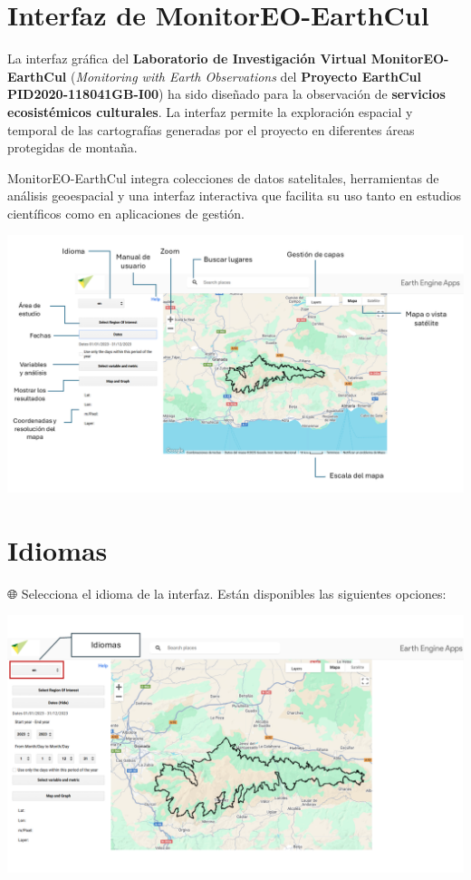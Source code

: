 \documentclass[
]{book}
\begin{document}
\chapter{Interfaz de MonitorEO-EarthCul}\label{interfaz}

La interfaz gráfica del \textbf{Laboratorio de Investigación Virtual MonitorEO-EarthCul} (\emph{Monitoring with Earth Observations} del \textbf{Proyecto EarthCul PID2020-118041GB-I00}) ha sido diseñado para la observación de \textbf{servicios ecosistémicos culturales}. La interfaz permite la exploración espacial y temporal de las cartografías generadas por el proyecto en diferentes áreas protegidas de montaña.

MonitorEO-EarthCul integra colecciones de datos satelitales, herramientas de análisis geoespacial y una interfaz interactiva que facilita su uso tanto en estudios científicos como en aplicaciones de gestión.

\includegraphics{assets/InterfazMonitorEO_es.png}

\chapter{Idiomas}\label{idiomas}

🌐 Selecciona el idioma de la interfaz. Están disponibles las siguientes opciones:

\includegraphics{assets/Idiomas.png}
\end{document}

